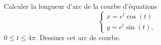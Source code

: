 \begin{exercice}\label{exoTP40003}

	Calculer la longueur d'arc de la courbe d'équations
	\begin{equation}
		\left\{
		\begin{array}{ll}
			x=e^t\cos(t)\\
			y=e^t\sin(t),
		\end{array}
		\right.
	\end{equation}
	$0\leq t\leq 4\pi$. Dessiner cet arc de courbe.

\end{exercice}
